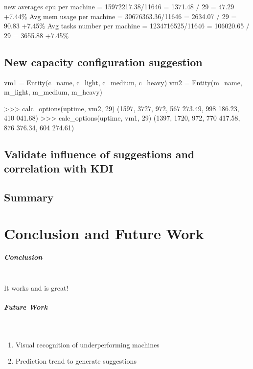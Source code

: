 \documentclass[]{final_report}
\newcommand{\myparagraph}[1]{\paragraph{#1}\mbox{}\\}
\begin{document}
new averages 
cpu per machine = 15972217.38/11646 = 1371.48 / 29 = 47.29 +7.44\%
Avg mem usage per machine = 30676363.36/11646 = 2634.07 / 29 = 90.83 +7.45\%
Avg tasks number per machine = 1234716525/11646 = 106020.65 / 29 = 3655.88 +7.45\%

\section{New capacity configuration suggestion}

vm1 = Entity(c_name, c_light, c_medium, c_heavy)
vm2 = Entity(m_name, m_light, m_medium, m_heavy)

>>> calc_options(uptime, vm2, 29)
(1597, 3727, 972, 567 273.49, 998 186.23, 410 041.68)
>>> calc_options(uptime, vm1, 29)
(1397, 1720, 972, 770 417.58, 876 376.34, 604 274.61)

\section{Validate influence of suggestions and correlation with KDI}

\section{Summary}



\chapter{Conclusion and Future Work}

\myparagraph{Conclusion}
It works and is great!

\myparagraph{Future Work}
\begin{enumerate}
\item Visual recognition of underperforming machines
\item Prediction trend to generate suggestions
\end{enumerate}


\newpage

\label{endpage}
{}

\end{document}
